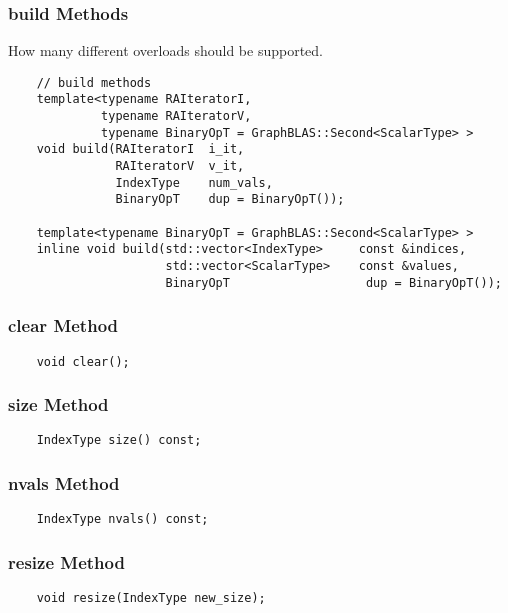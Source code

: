 

\subsubsection{{\sf build} Methods}

How many different overloads should be supported.

\begin{verbatim}
    // build methods
    template<typename RAIteratorI,
             typename RAIteratorV,
             typename BinaryOpT = GraphBLAS::Second<ScalarType> >
    void build(RAIteratorI  i_it,
               RAIteratorV  v_it,
               IndexType    num_vals,
               BinaryOpT    dup = BinaryOpT());

    template<typename BinaryOpT = GraphBLAS::Second<ScalarType> >
    inline void build(std::vector<IndexType>     const &indices,
                      std::vector<ScalarType>    const &values,
                      BinaryOpT                   dup = BinaryOpT());
\end{verbatim}

\subsubsection{{\sf clear} Method}
\begin{verbatim}
    void clear();
\end{verbatim}

\subsubsection{{\sf size} Method}
\begin{verbatim}
    IndexType size() const;
\end{verbatim}

\subsubsection{{\sf nvals} Method}
\begin{verbatim}
    IndexType nvals() const;
\end{verbatim}

\subsubsection{{\sf resize} Method}
\begin{verbatim}
    void resize(IndexType new_size);
\end{verbatim}


